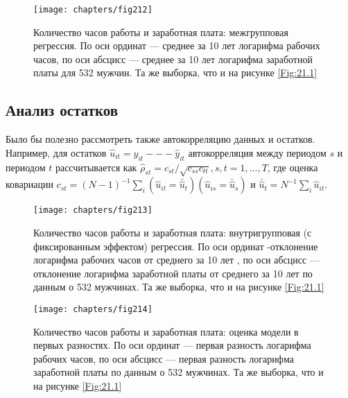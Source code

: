  \begin{figure}[ht]
                \begin{center}
                    \texttt{[image: chapters/fig212]}
                    \caption{Количество часов работы и заработная плата: межгрупповая регрессия. По оси ординат --- среднее за 10 лет логарифма рабочих часов, по оси абсцисс  --- среднее за 10 лет логарифма заработной платы для 532 мужчин. Та же выборка, что и на рисунке \ref{Fig:21.1}}
                    \label{Fig:21.2}
                \end{center}
     \end{figure}

\subsection{Анализ остатков}

Было бы полезно рассмотреть также автокорреляцию данных и остатков. Например, для остатков $\hat{u}_{it}=y_{it} --- \hat{y}_{it}$ автокорреляция между периодом $s$ и периодом $t$ рассчитывается как $\hat{\rho}_{st} = c_{st}/\sqrt{c_{ss} c_{tt}}, s, t = 1, \dots, T$, где оценка ковариации  $c_{st}=(N-1)^{-1} \sum_i (\hat{u}_{it} = \bar{\hat{u}}_t)(\hat{u}_{is} = \bar{\hat{u}}_s)$ и $\bar{\hat{u}}_t= N^{-1} \sum_i \hat{u}_{it}$.

 \begin{figure}[ht]
                \begin{center}
                    \texttt{[image: chapters/fig213]}
                    \caption{Количество часов работы и заработная плата: внутригрупповая (с фиксированным эффектом) регрессия. По оси ординат -отклонение логарифма рабочих часов от среднего за 10 лет , по оси абсцисс --- отклонение логарифма заработной платы от среднего за 10 лет  по данным о 532 мужчинах. Та же выборка, что и на рисунке \ref{Fig:21.1}}
                    \label{Fig:21.3}
                \end{center}
     \end{figure}

 \begin{figure}[ht]
                \begin{center}
                    \texttt{[image: chapters/fig214]}
                    \caption{Количество часов работы и заработная плата: оценка модели в первых разностях. По оси ординат --- первая разность логарифма рабочих часов, по оси абсцисс --- первая разность логарифма заработной платы по данным о 532 мужчинах. Та же выборка, что и на рисунке \ref{Fig:21.1}}
                    \label{Fig:21.4}
                \end{center}
     \end{figure}

